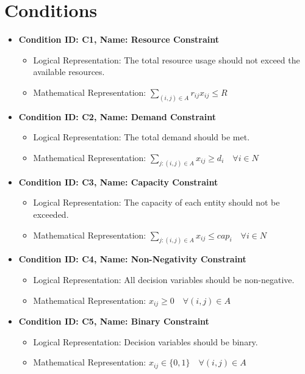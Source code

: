 \documentclass{article}
\begin{document}
\section{Conditions}
\begin{itemize}
    \item \textbf{Condition ID: C1, Name: Resource Constraint}
    \begin{itemize}
        \item Logical Representation: The total resource usage should not exceed the available resources.
        \item Mathematical Representation: $\sum_{(i,j) \in A} r_{ij} x_{ij} \leq R$
    \end{itemize}

    \item \textbf{Condition ID: C2, Name: Demand Constraint}
    \begin{itemize}
        \item Logical Representation: The total demand should be met.
        \item Mathematical Representation: $\sum_{j:(i,j) \in A} x_{ij} \geq d_i \quad \forall i \in N$
    \end{itemize}

    \item \textbf{Condition ID: C3, Name: Capacity Constraint}
    \begin{itemize}
        \item Logical Representation: The capacity of each entity should not be exceeded.
        \item Mathematical Representation: $\sum_{j:(i,j) \in A} x_{ij} \leq cap_i \quad \forall i \in N$
    \end{itemize}

    \item \textbf{Condition ID: C4, Name: Non-Negativity Constraint}
    \begin{itemize}
        \item Logical Representation: All decision variables should be non-negative.
        \item Mathematical Representation: $x_{ij} \geq 0 \quad \forall (i,j) \in A$
    \end{itemize}

    \item \textbf{Condition ID: C5, Name: Binary Constraint}
    \begin{itemize}
        \item Logical Representation: Decision variables should be binary.
        \item Mathematical Representation: $x_{ij} \in \{0, 1\} \quad \forall (i,j) \in A$
    \end{itemize}
\end{itemize}
\end{document}
